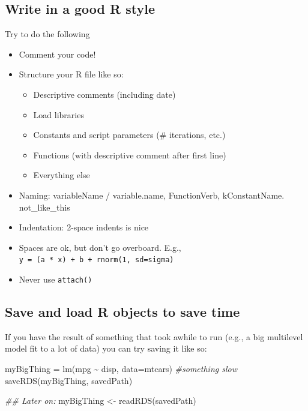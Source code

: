 \documentclass[
  letterpaper,
  DIV=11,
  numbers=noendperiod]{scrreprt}
\newenvironment{Shaded}{}{}
\newcommand{\AttributeTok}[1]{\textcolor[rgb]{0.49,0.56,0.16}{#1}}
\newcommand{\CommentTok}[1]{\textcolor[rgb]{0.38,0.63,0.69}{\textit{#1}}}
\newcommand{\DocumentationTok}[1]{\textcolor[rgb]{0.73,0.13,0.13}{\textit{#1}}}
\newcommand{\FunctionTok}[1]{\textcolor[rgb]{0.02,0.16,0.49}{#1}}
\newcommand{\NormalTok}[1]{#1}
\newcommand{\OtherTok}[1]{\textcolor[rgb]{0.00,0.44,0.13}{#1}}
\newcommand{\SpecialCharTok}[1]{\textcolor[rgb]{0.25,0.44,0.63}{#1}}
\providecommand{\tightlist}{%
  \setlength{\itemsep}{0pt}\setlength{\parskip}{0pt}}\usepackage{longtable,booktabs,array}
\begin{document}
\subsection{Write in a good R style}\label{write-in-a-good-r-style}

Try to do the following

\begin{itemize}
\tightlist
\item
  Comment your code!
\item
  Structure your R file like so:

  \begin{itemize}
  \tightlist
  \item
    Descriptive comments (including date)
  \item
    Load libraries
  \item
    Constants and script parameters (\# iterations, etc.)
  \item
    Functions (with descriptive comment after first line)
  \item
    Everything else
  \end{itemize}
\item
  Naming: variableName / variable.name, FunctionVerb, kConstantName.
  not\_like\_this
\item
  Indentation: 2-space indents is nice
\item
  Spaces are ok, but don't go overboard. E.g.,
  \texttt{y\ =\ (a\ *\ x)\ +\ b\ +\ rnorm(1,\ sd=sigma)}
\item
  Never use \texttt{attach()}
\end{itemize}

\subsection{Save and load R objects to save
time}\label{save-and-load-r-objects-to-save-time}

If you have the result of something that took awhile to run (e.g., a big
multilevel model fit to a lot of data) you can try saving it like so:

\begin{Shaded}
\begin{Highlighting}[]
\NormalTok{myBigThing }\OtherTok{=} \FunctionTok{lm}\NormalTok{(mpg }\SpecialCharTok{\textasciitilde{}}\NormalTok{ disp, }\AttributeTok{data=}\NormalTok{mtcars) }\CommentTok{\#something slow}
\FunctionTok{saveRDS}\NormalTok{(myBigThing, savedPath)}

\DocumentationTok{\#\# Later on:}
\NormalTok{myBigThing }\OtherTok{\textless{}{-}} \FunctionTok{readRDS}\NormalTok{(savedPath)}
\end{Highlighting}
\end{Shaded}
\end{document}
